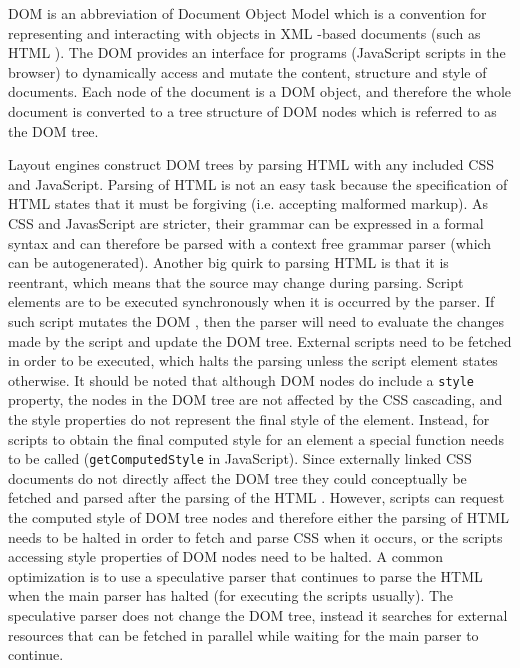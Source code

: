 \documentclass[a4paper,11pt]{kth-mag}
\newcommand{\code}[1]{\texttt{#1}}
\newcommand\abbr[2][]{\uppercase{#2}\ifthenelse{\equal{#1}{}}%
                     {}{#1}}
\begin{document}
        \abbr{dom} is an abbreviation of Document Object Model which is a convention for representing and interacting with objects in \abbr{xml}-based documents (such as \abbr{html}).
        The \abbr{dom} provides an interface for programs (JavaScript scripts in the browser) to dynamically access and mutate the content, structure and style of documents.
        Each node of the document is a \abbr{dom} object, and therefore the whole document is converted to a tree structure of \abbr{dom} nodes which is referred to as the \abbr{dom} tree.

        Layout engines construct \abbr{dom} trees by parsing \abbr{html} with any included \abbr{css} and JavaScript.
        Parsing of \abbr{html} is not an easy task because the specification of \abbr{html} states that it must be forgiving (i.e. accepting malformed markup).
        As \abbr{css} and JavasScript are stricter, their grammar can be expressed in a formal syntax and can therefore be parsed with a context free grammar parser (which can be autogenerated).
        Another big quirk to parsing \abbr{html} is that it is reentrant, which means that the source may change during parsing.
        Script elements are to be executed synchronously when it is occurred by the parser.
        If such script mutates the \abbr{dom}, then the parser will need to evaluate the changes made by the script and update the \abbr{dom} tree.
        External scripts need to be fetched in order to be executed, which halts the parsing unless the script element states otherwise.
        It should be noted that although \abbr{dom} nodes do include a \code{style} property, the nodes in the \abbr{dom} tree are not affected by the \abbr{css} cascading, and the style properties do not represent the final style of the element.
        Instead, for scripts to obtain the final computed style for an element a special function needs to be called (\code{getComputedStyle} in JavaScript).
        Since externally linked \abbr{css} documents do not directly affect the \abbr{dom} tree they could conceptually be fetched and parsed after the parsing of the \abbr{html}.
        However, scripts can request the computed style of \abbr{dom} tree nodes and therefore either the parsing of \abbr{html} needs to be halted in order to fetch and parse \abbr{css} when it occurs, or the scripts accessing style properties of \abbr{dom} nodes need to be halted.
        A common optimization is to use a speculative parser that continues to parse the \abbr{html} when the main parser has halted (for executing the scripts usually).
        The speculative parser does not change the \abbr{dom} tree, instead it searches for external resources that can be fetched in parallel while waiting for the main parser to continue.
\end{document}
